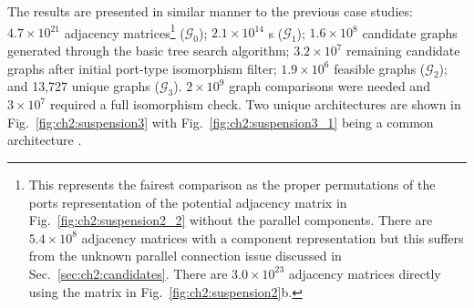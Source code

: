 The results are presented in similar manner to the previous case studies: $4.7\times 10^{21}$ adjacency matrices\footnote{This represents the fairest comparison as the proper permutations of the ports representation of the potential adjacency matrix in Fig.~\ref{fig:ch2:suspension2_2} without the parallel components. There are $5.4 \times 10^8$ adjacency matrices with a component representation but this suffers from the unknown parallel connection issue discussed in Sec.~\ref{sec:ch2:candidates}. There are $3.0 \times 10^{23}$ adjacency matrices directly using the matrix in Fig.~\ref{fig:ch2:suspension2}b.} ($\mathcal{G}_0$); $2.1 \times 10^{14}$ \mypm{}s ($\mathcal{G}_1$); $1.6 \times 10^8$ candidate graphs generated through the basic tree search algorithm; $3.2 \times 10^7$ remaining candidate graphs after initial port-type isomorphism filter; $1.9 \times 10^6$ feasible graphs ($\mathcal{G}_2$); and 13,727 unique graphs ($\mathcal{G}_3$). $2\times 10^{9}$ graph comparisons were needed and $3 \times 10^7$ required a full isomorphism check.
Two unique architectures are shown in Fig.~\ref{fig:ch2:suspension3} with Fig.~\ref{fig:ch2:suspension3_1} being a common architecture \cite{Allison2014b}.

